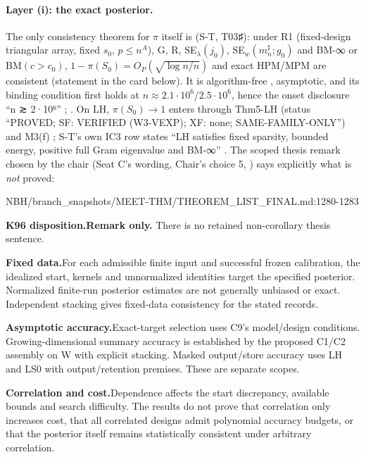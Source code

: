 \paragraph{Layer (i): the exact posterior.} The only consistency theorem for $\pi$ itself is  (S-T, T03♯): under R1 (fixed-design triangular array, fixed $s_0$, $p\le n^A$), G, R, SE$_{\lambda}(j_0)$, SE$_w(m_n^{\sharp};g_0)$ and BM-∞ or BM$(c>c_0)$, $1-\pi(S_0)=O_P(\sqrt{\log n/n})$ and exact HPM/MPM are consistent (statement in the card below). It is algorithm-free , asymptotic, and its binding condition first holds at $n\approx 2.1\cdot10^{6}$/$2.5\cdot10^{6}$, hence the onset disclosure ``n ≳ 2·10⁶'' ; . On LH, $\pi(S_0)\to1$ enters through Thm5-LH (status ``PROVED; SF: VERIFIED (W3-VEXP); XF: none; SAME-FAMILY-ONLY'') and M3(f) ; S-T's own IC3 row states ``LH satisfies fixed sparsity, bounded energy, positive full Gram eigenvalue and BM-∞'' . The scoped thesis remark chosen by the chair (Seat C's wording, Chair's choice 5, ) says explicitly what is \emph{not} proved:

\begin{stmt}{NBH/branch_snapshots/MEET-THM/THEOREM_LIST_FINAL.md:1280-1283}
\par\smallskip\noindent\textbf{K96 disposition.}\enspace \textbf{Remark only.} There is no retained non-corollary thesis sentence.
\par\smallskip\noindent\textbf{Fixed data.}\enspace For each admissible finite input and successful frozen calibration, the idealized start, kernels and unnormalized identities target the specified posterior. Normalized finite-run posterior estimates are not generally unbiased or exact. Independent stacking gives fixed-data consistency for the stated records.
\par\smallskip\noindent\textbf{Asymptotic accuracy.}\enspace Exact-target selection uses C9’s model/design conditions. Growing-dimensional summary accuracy is established by the proposed C1/C2 assembly on W with explicit stacking. Masked output/store accuracy uses LH and LS0 with output/retention premises. These are separate scopes.
\par\smallskip\noindent\textbf{Correlation and cost.}\enspace Dependence affects the start discrepancy, available bounds and search difficulty. The results do not prove that correlation only increases cost, that all correlated designs admit polynomial accuracy budgets, or that the posterior itself remains statistically consistent under arbitrary correlation.
\end{stmt}


